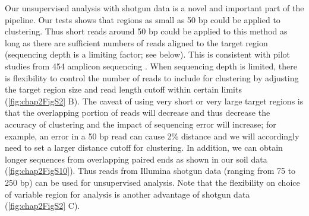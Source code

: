 \documentclass[]{msu-thesis}
\begin{document}
Our unsupervised analysis with shotgun data is a novel and important part of the pipeline. Our tests shows that regions as small as 50 bp could be applied to clustering. Thus short reads around 50 bp could be applied to this method as long as there are sufficient numbers of reads aligned to the target region (sequencing depth is a limiting factor; see below). This is consistent with pilot studies from 454 amplicon sequencing \cite{liu_short_2007,sogin_microbial_2006}. When sequencing depth is limited, there is flexibility to control the number of reads to include for clustering by adjusting the target region size and read length cutoff within certain limits (\cref{fig:chap2FigS2} B). The caveat of using very short or very large target regions is that the overlapping portion of reads will decrease and thus decrease the accuracy of clustering and the impact of sequencing error will increase; for example, an error in a 50 bp read can cause 2\% distance and we will accordingly need to set a larger distance cutoff for clustering. In addition, we can obtain longer sequences from overlapping paired ends as shown in our soil data (\cref{fig:chap2FigS10}). Thus reads from Illumina shotgun data (ranging from 75 to 250 bp) can be used for unsupervised analysis. Note that the flexibility on choice of variable region for analysis is another advantage of shotgun data (\cref{fig:chap2FigS2} C).
\end{document}
